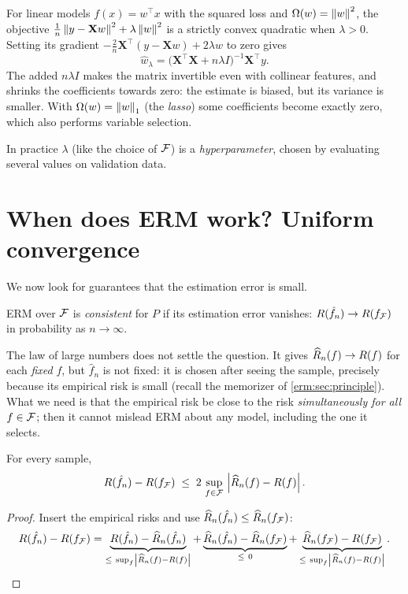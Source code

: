 \begin{notechapter}
\begin{example}
For linear models $f(x) = w^\top x$ with the squared loss and
$\Omega(w) = \left\|w\right\|^2$, the objective
$\frac1n\left\|y - \mathbf Xw\right\|^2 + \lambda\left\|w\right\|^2$ is a strictly convex
quadratic when $\lambda > 0$. Setting its gradient
$-\frac2n\mathbf X^\top(y - \mathbf Xw) + 2\lambda w$ to zero gives
\[
  \hat w_\lambda = \bigl(\mathbf X^\top\mathbf X + n\lambda I\bigr)^{-1}\mathbf X^\top y .
\]
The added $n\lambda I$ makes the matrix invertible even with collinear
features, and shrinks the coefficients towards zero: the estimate is biased,
but its variance is smaller. With $\Omega(w) = \left\|w\right\|_1$ (the \emph{lasso})
some coefficients become exactly zero, which also performs variable selection.
\end{example}

In practice $\lambda$ (like the choice of $\mathcal{F}$) is a \emph{hyperparameter},
chosen by evaluating several values on validation data.

\section{When does ERM work? Uniform convergence}\label{erm:sec:uniform}

We now look for guarantees that the estimation error is small.

\begin{definition}[Consistency]
ERM over $\mathcal{F}$ is \emph{consistent} for $P$ if its estimation error vanishes:
$R(\hat f_n) \to R(f_{\mathcal{F}})$ in probability as $n\to\infty$.
\end{definition}

The law of large numbers does not settle the question. It gives
$\widehat{R}_n(f) \to R(f)$ for each \emph{fixed} $f$, but $\hat f_n$ is not fixed:
it is chosen after seeing the sample, precisely because its empirical risk is
small (recall the memorizer of \cref{erm:sec:principle}). What we need is that the empirical risk be
close to the risk \emph{simultaneously for all} $f \in \mathcal{F}$; then it cannot
mislead ERM about any model, including the one it selects.

\begin{theorem}\label{erm:thm:uniform}
For every sample,
\[
  R(\hat f_n) - R(f_{\mathcal{F}}) \;\leq\; 2\,\sup_{f\in\mathcal{F}}\,\left|\widehat{R}_n(f) - R(f)\right| .
\]
\end{theorem}

\begin{proof}
Insert the empirical risks and use $\widehat{R}_n(\hat f_n) \leq \widehat{R}_n(f_{\mathcal{F}})$:
\[
  \Risk(\hat f_n) - \Risk(f_\Hs)
  = \underbrace{\Risk(\hat f_n) - \ERisk(\hat f_n)}_{\leq\ \sup_f \abs{\ERisk(f) - \Risk(f)}}
  + \underbrace{\ERisk(\hat f_n) - \ERisk(f_\Hs)}_{\leq\ 0}
  + \underbrace{\ERisk(f_\Hs) - \Risk(f_\Hs)}_{\leq\ \sup_f\abs{\ERisk(f) - \Risk(f)}} . \qedhere
\]
\end{proof}


\end{notechapter}
